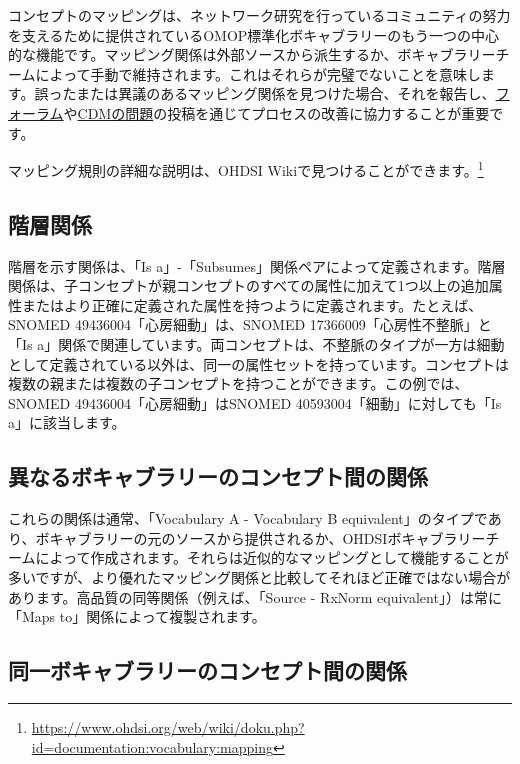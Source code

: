 \documentclass[
  11pt]{book}
\theoremstyle{definition}
\theoremstyle{definition}
\theoremstyle{definition}
\theoremstyle{definition}
\theoremstyle{remark}
\begin{document}
コンセプトのマッピングは、ネットワーク研究を行っているコミュニティの努力を支えるために提供されているOMOP標準化ボキャブラリーのもう一つの中心的な機能です。マッピング関係は外部ソースから派生するか、ボキャブラリーチームによって手動で維持されます。これはそれらが完璧でないことを意味します。誤ったまたは異議のあるマッピング関係を見つけた場合、それを報告し、\href{https://forums.ohdsi.org}{フォーラム}や\href{https://github.com/OHDSI/CommonDataModel/issues}{CDMの問題}の投稿を通じてプロセスの改善に協力することが重要です。

マッピング規則の詳細な説明は、OHDSI Wikiで見つけることができます。\footnote{\url{https://www.ohdsi.org/web/wiki/doku.php?id=documentation:vocabulary:mapping}}

\subsection{階層関係}\label{ux968eux5c64ux95a2ux4fc2}

階層を示す関係は、「Is a」-「Subsumes」関係ペアによって定義されます。階層関係は、子コンセプトが親コンセプトのすべての属性に加えて1つ以上の追加属性またはより正確に定義された属性を持つように定義されます。たとえば、SNOMED 49436004「心房細動」は、SNOMED 17366009「心房性不整脈」と「Is a」関係で関連しています。両コンセプトは、不整脈のタイプが一方は細動として定義されている以外は、同一の属性セットを持っています。コンセプトは複数の親または複数の子コンセプトを持つことができます。この例では、SNOMED 49436004「心房細動」はSNOMED 40593004「細動」に対しても「Is a」に該当します。

\subsection{異なるボキャブラリーのコンセプト間の関係}\label{ux7570ux306aux308bux30dcux30adux30e3ux30d6ux30e9ux30eaux30fcux306eux30b3ux30f3ux30bbux30d7ux30c8ux9593ux306eux95a2ux4fc2}

これらの関係は通常、「Vocabulary A - Vocabulary B equivalent」のタイプであり、ボキャブラリーの元のソースから提供されるか、OHDSIボキャブラリーチームによって作成されます。それらは近似的なマッピングとして機能することが多いですが、より優れたマッピング関係と比較してそれほど正確ではない場合があります。高品質の同等関係（例えば、「Source - RxNorm equivalent」）は常に「Maps to」関係によって複製されます。

\subsection{同一ボキャブラリーのコンセプト間の関係}\label{ux540cux4e00ux30dcux30adux30e3ux30d6ux30e9ux30eaux30fcux306eux30b3ux30f3ux30bbux30d7ux30c8ux9593ux306eux95a2ux4fc2}
\end{document}
